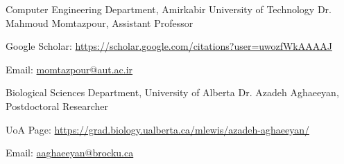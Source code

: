 \begin{cventries}
  \cventry
    {Computer Engineering Department, Amirkabir University of Technology} %
    {Dr. Mahmoud Momtazpour, Assistant Professor} %
    {} %
    {} %
    {
      \begin{cvitems} %
        \item {Google Scholar: \href{https://scholar.google.com/citations?user=uwozfWkAAAAJ&hl=en}{https://scholar.google.com/citations?user=uwozfWkAAAAJ}}
        \item {Email: \href{mailto:momtazpour@aut.ac.ir}{momtazpour@aut.ac.ir}}
      \end{cvitems}
    }

  \cventry
    {Biological Sciences Department, University of Alberta} %
    {Dr. Azadeh Aghaeeyan, Postdoctoral Researcher} %
    {} %
    {} %
    {
      \begin{cvitems} %
        \item {UoA Page: \href{https://grad.biology.ualberta.ca/mlewis/azadeh-aghaeeyan/}{https://grad.biology.ualberta.ca/mlewis/azadeh-aghaeeyan/}}
        \item {Email: \href{mailto:aaghaeeyan@brocku.ca}{aaghaeeyan@brocku.ca}}
      \end{cvitems}
    }

\end{cventries}
